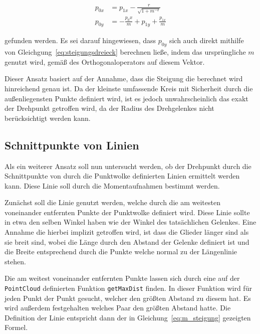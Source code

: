 \begin{equation}
    \begin{split}
    p_{0x} &= p_{1x} - \frac{r}{\sqrt{1 + m^{-2}}} \\
    p_{0y} &= - \frac{p_0x}{m} + p_{1y} + \frac{p_{1x}}{m}
    \end{split}
\end{equation}

gefunden werden.
Es sei darauf hingewiesen, dass $p_{0y}$ sich auch direkt mithilfe von Gleichgung~\ref{eq:steigungsdreieck} berechnen ließe, indem das ursprüngliche $m$ genutzt wird, gemäß des Orthogonaloperators auf diesem Vektor.

Dieser Ansatz basiert auf der Annahme, dass die Steigung die berechnet wird hinreichend genau ist.
Da der kleinste umfassende Kreis mit Sicherheit durch die außenliegensten Punkte definiert wird, ist es jedoch unwahrscheinlich das exakt der Drehpunkt getroffen wird, da der Radius des Drehgelenkes nicht berücksichtigt werden kann.



\subsection{Schnittpunkte von Linien}

Als ein weiterer Ansatz soll nun untersucht werden, ob der Drehpunkt durch die Schnittpunkte von durch die Punktwolke definierten Linien ermittelt werden kann.
Diese Linie soll durch die Momentaufnahmen bestimmt werden.

Zunächst soll die Linie genutzt werden, welche durch die am weitesten voneinander entfernten Punkte der Punktwolke definiert wird.
Diese Linie sollte in etwa den selben Winkel haben wie der Winkel des tatsächlichen Gelenkes.
Eine Annahme die hierbei implizit getroffen wird, ist dass die Glieder länger sind als sie breit sind, wobei die Länge durch den Abstand der Gelenke definiert ist und die Breite entsprechend durch die Punkte welche normal zu der Längenlinie stehen.

Die am weitest voneinander entfernten Punkte lassen sich durch eine auf der \lstinline{PointCloud} definierten Funktion \lstinline{getMaxDist} finden.
In dieser Funktion wird für jeden Punkt der Punkt gesucht, welcher den größten Abstand zu diesem hat. Es wird außerdem festgehalten welches Paar den größten Abstand hatte.
Die Definition der Linie entspricht dann der in Gleichung~\ref{eq:m_steigung} gezeigten Formel.

